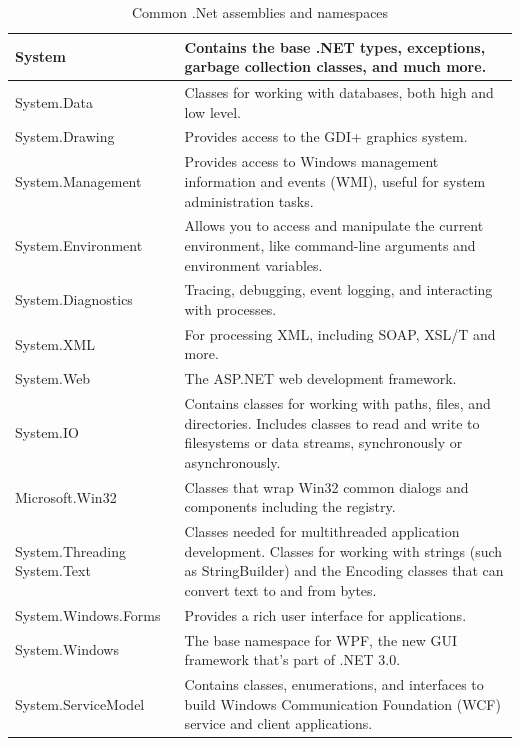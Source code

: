 \documentclass[12pt,a4paper,final,twoside,titlepage]{book}
\begin{document}
\begin{table}
\caption{Common .Net assemblies and namespaces}
\begin{tabular}{|p{4cm}|p{10cm}|}
\hline
System & Contains the base .NET types, exceptions, garbage collection classes, and much more.\\
\hline
System.Data & Classes for working with databases, both high and low level. \\
\hline
System.Drawing & Provides access to the GDI+ graphics system. \\
\hline
System.Management & Provides access to Windows management information and events (WMI), useful for system administration tasks. \\
\hline
System.Environment & Allows you to access and manipulate the current environment, like command-line arguments and environment variables. \\
\hline
System.Diagnostics & Tracing, debugging, event logging, and interacting with processes.\\
\hline
System.XML & For processing XML, including SOAP, XSL/T and more. \\
\hline
System.Web & The ASP.NET web development framework.\\
\hline
System.IO & Contains classes for working with paths, files, and directories. Includes classes to read and write to filesystems or data streams, synchronously or asynchronously. \\ \hline
Microsoft.Win32 & Classes that wrap Win32 common dialogs and components including the registry. \\ \hline
System.Threading System.Text & Classes needed for multithreaded application development. Classes for working with strings (such as StringBuilder) and the Encoding classes that can convert text to and from bytes.\\ \hline
System.Windows.Forms & Provides a rich user interface for applications. \\ \hline
System.Windows & The base namespace for WPF, the new GUI framework that’s part of .NET 3.0. \\ \hline
System.ServiceModel & Contains classes, enumerations, and interfaces to build Windows Communication Foundation (WCF) service and client applications. \\ \hline
\end{tabular}
\end{table}
\end{document}
